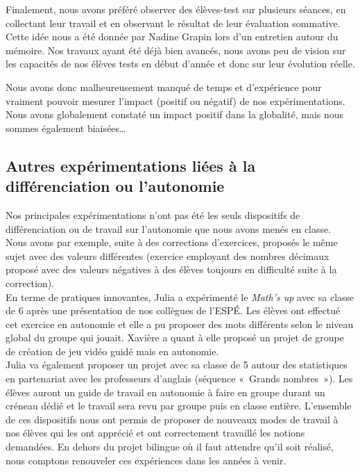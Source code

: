Finalement, nous avons préféré observer des élèves-test sur plusieurs séances, en collectant leur travail et en observant le résultat de leur évaluation sommative. Cette idée nous a été donnée par Nadine Grapin lors d'un entretien autour du mémoire. Nos travaux ayant été déjà bien avancés, nous avons peu de vision sur les capacités de nos élèves tests en début d'année et donc sur leur évolution réelle.

Nous avons donc malheureusement manqué de temps et d'expérience pour vraiment
pouvoir mesurer l'impact (positif ou négatif) de nos expérimentations. Nous
avons globalement constaté un impact positif dans la globalité, mais nous sommes
également biaisées…

\subsection{Autres expérimentations liées à la différenciation ou l’autonomie}
Nos principales expérimentations n'ont pas été les seuls dispositifs de différenciation ou de travail sur l'autonomie que nous avons menés en classe. Nous avons par exemple, suite à des corrections d'exercices, proposés le même sujet avec des valeurs différentes (exercice employant des nombres décimaux proposé avec des valeurs négatives à des élèves toujours en difficulté suite à la correction).\\
En terme de pratiques innovantes, Julia a expérimenté le \textit{Math's up}\cite{maths_up} avec sa classe de 6 après une présentation de nos collègues de l'ESPÉ. Les élèves ont effectué cet exercice en autonomie et elle a pu proposer des mots différents selon le niveau global du groupe qui jouait. Xavière a quant à elle proposé un projet de groupe de création de jeu vidéo guidé mais en autonomie.\\
Julia va également proposer un projet avec sa classe de 5 autour des statistiques en partenariat avec les professeurs d'anglais (séquence « Grands nombres »). Les élèves auront un guide de travail en autonomie à faire en groupe durant un créneau dédié et le travail sera revu par groupe puis en classe entière.
L'ensemble de ces dispositifs nous ont permis de proposer de nouveaux modes de travail à nos élèves qui les ont apprécié et ont correctement travaillé les notions demandées. En dehors du projet bilingue où il faut attendre qu'il soit réalisé, nous comptons renouveler ces expériences dans les années à venir.
